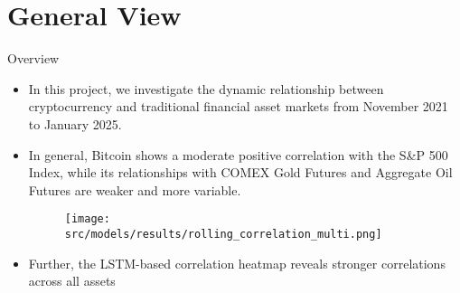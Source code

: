 \section{General View}
    \begin{frame}{Overview}
    \begin{itemize}
     \item<1-> In this project, we investigate the dynamic relationship between cryptocurrency and traditional financial asset markets from November 2021 to January 2025.
     \item<2-> In general, Bitcoin shows a moderate positive correlation with the S\&P 500 Index, while its relationships with COMEX Gold Futures and Aggregate Oil Futures are weaker and more variable.
      {\begin{figure}[h]\texttt{[image: src/models/results/rolling\_correlation\_multi.png]}\end{figure}}
     \item<3> Further, the LSTM-based correlation heatmap reveals stronger correlations across all assets
     
    \end{itemize}
    \end{frame}
    
 
 